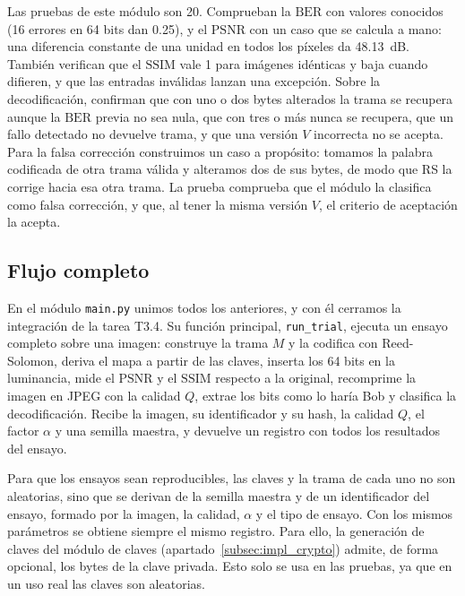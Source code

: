 \documentclass[IB]{TFUOC}%
\begin{document}
Las pruebas de este módulo son 20. Comprueban la $\mathrm{BER}$ con valores 
conocidos (16 errores en 64 bits dan 0{.}25), y el $\mathrm{PSNR}$ con un caso que se calcula a 
mano: una diferencia constante de una unidad en todos los píxeles da 48{.}13~dB. También verifican 
que el $\mathrm{SSIM}$ vale 1 para imágenes idénticas y baja cuando difieren, y que las entradas 
inválidas lanzan una excepción. Sobre la decodificación, confirman que con uno o dos bytes 
alterados la trama se recupera aunque la $\mathrm{BER}$ previa no sea nula, que con tres o más 
nunca se recupera, que un fallo detectado no devuelve trama, y que una versión $V$ incorrecta no 
se acepta. Para la falsa corrección construimos un caso a propósito: tomamos la palabra codificada 
de otra trama válida y alteramos dos de sus bytes, de modo que RS la corrige hacia esa otra trama. 
La prueba comprueba que el módulo la clasifica como falsa corrección, y que, al tener la misma 
versión $V$, el criterio de aceptación la acepta.

\subsection{Flujo completo}
\label{subsec:impl_main}

En el módulo \texttt{main.py} unimos todos los anteriores, y con él cerramos la integración de la tarea T3.4. Su función principal, \texttt{run\_trial}, 
ejecuta un ensayo completo sobre una imagen: construye la trama $M$ y la 
codifica con Reed-Solomon, deriva el mapa a partir de las claves, inserta los 
64 bits en la luminancia, mide el $\mathrm{PSNR}$ y el $\mathrm{SSIM}$ respecto a 
la original, recomprime la imagen en JPEG con la calidad $Q$, extrae los bits como 
lo haría Bob y clasifica la decodificación. Recibe la imagen, su identificador y su 
hash, la calidad $Q$, el factor $\alpha$ y una semilla maestra, y devuelve un registro 
con todos los resultados del ensayo.

Para que los ensayos sean reproducibles, las claves y la trama de cada uno no son 
aleatorias, sino que se derivan de la semilla maestra y de un identificador 
del ensayo, formado por la imagen, la calidad, $\alpha$ y el tipo de ensayo. Con los mismos 
parámetros se obtiene siempre el mismo registro. Para ello, la generación de claves del 
módulo de claves (apartado~\ref{subsec:impl_crypto}) admite, de forma opcional, los 
bytes de la clave privada. Esto solo se usa en las pruebas, ya que en un uso real las 
claves son aleatorias.
\end{document}
